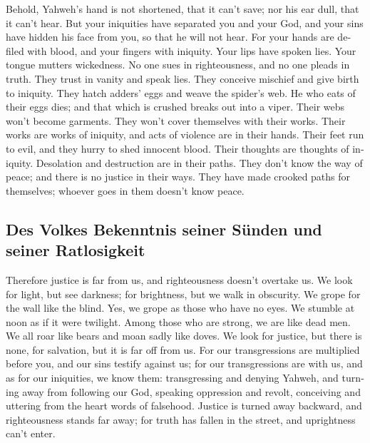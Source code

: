 \begin{paracol}{2}
\begin{otherlanguage}{english}
 Behold, Yahweh's hand is not shortened, that it can't
save; nor his ear dull, that it can't hear.  But your
iniquities have separated you and your God, and your sins have hidden
his face from you, so that he will not hear.  For your
hands are defiled with blood, and your fingers with iniquity. Your lips
have spoken lies. Your tongue mutters wickedness.  No one
sues in righteousness, and no one pleads in truth. They trust in vanity
and speak lies. They conceive mischief and give birth to iniquity.
 They hatch adders' eggs and weave the spider's web. He
who eats of their eggs dies; and that which is crushed breaks out into a
viper.  Their webs won't become garments. They won't cover
themselves with their works. Their works are works of iniquity, and acts
of violence are in their hands.  Their feet run to evil,
and they hurry to shed innocent blood. Their thoughts are thoughts of
iniquity. Desolation and destruction are in their paths. 
They don't know the way of peace; and there is no justice in their ways.
They have made crooked paths for themselves; whoever goes in them
doesn't know peace.

\hypertarget{des-volkes-bekenntnis-seiner-suxfcnden-und-seiner-ratlosigkeit-1}{%
\subsection{Des Volkes Bekenntnis seiner Sünden und seiner
Ratlosigkeit}\label{des-volkes-bekenntnis-seiner-suxfcnden-und-seiner-ratlosigkeit-1}}

 Therefore justice is far from us, and righteousness
doesn't overtake us. We look for light, but see darkness; for
brightness, but we walk in obscurity.  We grope for the
wall like the blind. Yes, we grope as those who have no eyes. We stumble
at noon as if it were twilight. Among those who are strong, we are like
dead men.  We all roar like bears and moan sadly like
doves. We look for justice, but there is none, for salvation, but it is
far off from us.  For our transgressions are multiplied
before you, and our sins testify against us; for our transgressions are
with us, and as for our iniquities, we know them: 
transgressing and denying Yahweh, and turning away from following our
God, speaking oppression and revolt, conceiving and uttering from the
heart words of falsehood.  Justice is turned away
backward, and righteousness stands far away; for truth has fallen in the
street, and uprightness can't enter.


\end{otherlanguage}
\end{paracol}
